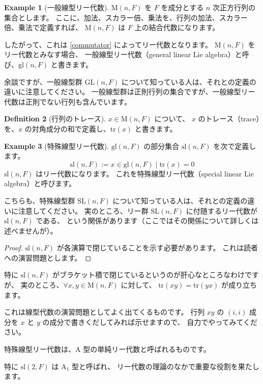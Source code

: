\documentclass{ltjsarticle}
\theoremstyle{definition}
\newtheorem{definition}{Definition}[section]
\newtheorem{example}[definition]{Example}
\begin{document}
\begin{example}[一般線型リー代数]
    $\mathrm{M}(n,F)$ を $F$ を成分とする $n$ 次正方行列の集合とします。
    ここに、加法、スカラー倍、乗法を、行列の加法、スカラー倍、乗法で定義すれば、
    $\mathrm{M}(n,F)$ は $F$ 上の結合代数になります。

    したがって、これは \ref{commutator} によってリー代数となります。
    $\mathrm{M}(n,F)$ をリー代数とみなす場合、
    一般線型リー代数（general linear Lie algebra）と呼び、$\mathrm{gl}(n,F)$ と書きます。
\end{example}

余談ですが、一般線型群 $\mathrm{GL}(n,F)$ について知っている人は、それとの定義の違いに注意してください。
一般線型群は正則行列の集合ですが、一般線型リー代数は正則でない行列も含んでいます。

\begin{definition}[行列のトレース]
    $x \in \mathrm{M}(n,F)$ について、
    $x$ のトレース（trace）を、$x$ の対角成分の和で定義し、$\mathrm{tr}(x)$ と書きます。
\end{definition}

\begin{example}[特殊線型リー代数]
    $\mathrm{gl}(n,F)$ の部分集合 $\mathrm{sl}(n,F)$ を次で定義します。
    \[
        \mathrm{sl}(n,F) := {x \in \mathrm{gl}(n,F) \mid \mathrm{tr}(x) = 0}
    \]
    $\mathrm{sl}(n,F)$ はリー代数になります。
    これを特殊線型リー代数（special linear Lie algebra）と呼びます。
\end{example}

こちらも、特殊線型群 $\mathrm{SL}(n,F)$ について知っている人は、それとの定義の違いに注意してください。
実のところ、リー群 $\mathrm{SL}(n,F)$ に付随するリー代数が $\mathrm{sl}(n,F)$ である、
という関係があります（ここではその関係について詳しくは述べませんが）。

\begin{proof}
    $\mathrm{sl}(n,F)$ が各演算で閉じていることを示す必要があります。
    これは読者への演習問題とします。
\end{proof}

特に $\mathrm{sl}(n,F)$ がブラケット積で閉じているというのが肝心なところなわけですが、
実のところ、$\forall x,y \in \mathrm{M}(n,F)$ に対して、
$\mathrm{tr}(xy) = \mathrm{tr}(yx)$ が成り立ちます。

これは線型代数の演習問題としてよく出てくるものです。
行列 $xy$ の $(i,i)$ 成分を $x$ と $y$ の成分で書きくだしてみれば示せますので、
自力でやってみてください。

特殊線型リー代数は、$\mathrm{A}$ 型の単純リー代数と呼ばれるものです。

特に $\mathrm{sl}(2,F)$ は $\mathrm{A}_1$ 型と呼ばれ、
リー代数の理論のなかで重要な役割を果たします。
\end{document}
